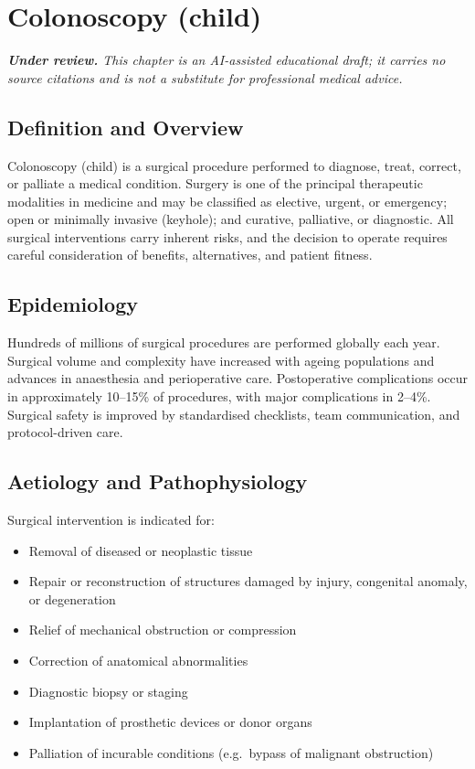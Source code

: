\chapter{Colonoscopy (child)}

\medskip
\noindent\textit{\textbf{Under review.} This chapter is an AI-assisted educational draft; it carries no source citations and is not a substitute for professional medical advice.}

\section*{Definition and Overview}
Colonoscopy (child) is a surgical procedure performed to diagnose, treat, correct, or palliate a medical condition. Surgery is one of the principal therapeutic modalities in medicine and may be classified as elective, urgent, or emergency; open or minimally invasive (keyhole); and curative, palliative, or diagnostic. All surgical interventions carry inherent risks, and the decision to operate requires careful consideration of benefits, alternatives, and patient fitness.

\section*{Epidemiology}
Hundreds of millions of surgical procedures are performed globally each year. Surgical volume and complexity have increased with ageing populations and advances in anaesthesia and perioperative care. Postoperative complications occur in approximately 10--15\% of procedures, with major complications in 2--4\%. Surgical safety is improved by standardised checklists, team communication, and protocol-driven care.

\section*{Aetiology and Pathophysiology}
Surgical intervention is indicated for:

\begin{itemize}
    \item Removal of diseased or neoplastic tissue
    \item Repair or reconstruction of structures damaged by injury, congenital anomaly, or degeneration
    \item Relief of mechanical obstruction or compression
    \item Correction of anatomical abnormalities
    \item Diagnostic biopsy or staging
    \item Implantation of prosthetic devices or donor organs
    \item Palliation of incurable conditions (e.g.\ bypass of malignant obstruction)
\end{itemize}

